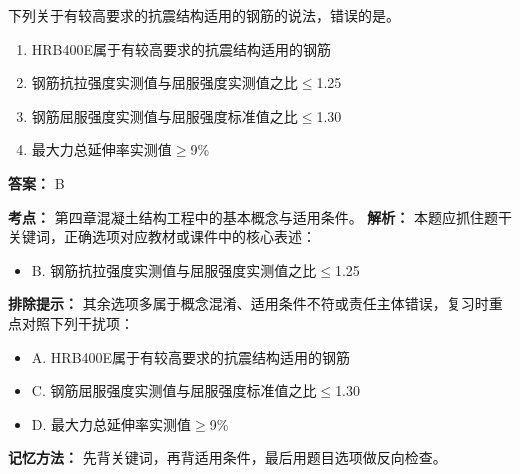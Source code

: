 \documentclass[UTF8,fontset=fandol,11pt]{ctexart}
\begin{document}
\vspace{0.2em}

\begin{quizbox}[title={第 3 题}]
下列关于有较高要求的抗震结构适用的钢筋的说法，错误的是。\\
\begin{enumerate}[label=\Alph*.]
\item HRB400E属于有较高要求的抗震结构适用的钢筋
\item 钢筋抗拉强度实测值与屈服强度实测值之比$\leq$1.25
\item 钢筋屈服强度实测值与屈服强度标准值之比$\leq$1.30
\item 最大力总延伸率实测值$\geq$9\%
\end{enumerate}
\textbf{答案：} B
\vspace{0.25em}
\begin{answerbox}[title={考点解析}]
\textbf{考点：} 第四章混凝土结构工程中的基本概念与适用条件。
\textbf{解析：} 本题应抓住题干关键词，正确选项对应教材或课件中的核心表述：
\begin{itemize}
\item B. 钢筋抗拉强度实测值与屈服强度实测值之比$\leq$1.25
\end{itemize}
\textbf{排除提示：} 其余选项多属于概念混淆、适用条件不符或责任主体错误，复习时重点对照下列干扰项：
\begin{itemize}
\item A. HRB400E属于有较高要求的抗震结构适用的钢筋
\item C. 钢筋屈服强度实测值与屈服强度标准值之比$\leq$1.30
\item D. 最大力总延伸率实测值$\geq$9\%
\end{itemize}
\textbf{记忆方法：} 先背关键词，再背适用条件，最后用题目选项做反向检查。
\end{answerbox}
\end{quizbox}

\vspace{0.2em}
\end{document}

